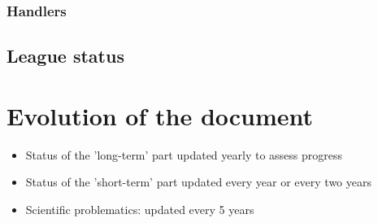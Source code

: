 \documentclass{article}
\begin{document}

\subsubsection{Handlers}

\subsection{League status}
\begin{figure}

\end{figure}


\section{Evolution of the document}

\begin{itemize}
\item Status of the 'long-term' part updated yearly to assess progress
\item Status of the 'short-term' part updated every year or every two years
\item Scientific problematics: updated every 5 years
\end{itemize}


\newpage

\printbibliography
\end{document}
